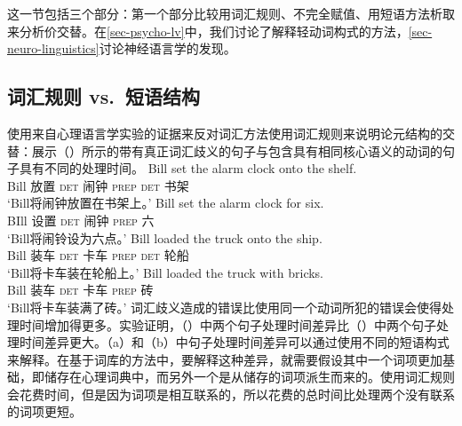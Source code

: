 \begin{exe}
\begin{xlist}[iv.]
\begin{exe}
\begin{xlist}[iv.]
这一节包括三个部分：第一个部分比较用词汇规则、不完全赋值、用短语方法析取来分析价交替。在\ref{sec-psycho-lv}中，我们讨论了解释轻动词构式的方法，\ref{sec-neuro-linguistics}讨论神经语言学的发现。

\subsection{词汇规则 vs.\ 短语结构}
\label{sec-lr-phrasal-psycho}
\mbox{}\citet[\S~1.4.5]{Goldberg95a}使用来自心理语言学实验的证据来反对词汇方法使用词汇规则来说明论元结构的交替：\citet{CT88a}展示（）所示的带有真正词汇歧义的句子与包含具有相同核心语义的动词的句子具有不同的处理时间。
\eal
\ex
\gll Bill set the alarm clock onto the shelf.\\
     Bill 放置 \textsc{det} 闹钟 \textsc{prep} \textsc{det} 书架\\
\glt `Bill将闹钟放置在书架上。' 
\ex
\gll Bill set the alarm clock for six.\\
     BIll 设置 \textsc{det} 闹钟 \textsc{prep} 六\\
\glt `Bill将闹铃设为六点。' 
\zl
\eal
\ex
\gll Bill loaded the truck onto the ship.\\
     Bill 装车 \textsc{det} 卡车 \textsc{prep} \textsc{det} 轮船\\
\glt `Bill将卡车装在轮船上。' 
\ex
\gll Bill loaded the truck with bricks.\\
     Bill 装车 \textsc{det} 卡车 \textsc{prep} 砖\\
\glt `Bill将卡车装满了砖。' 
\zl
词汇歧义造成的错误比使用同一个动词所犯的错误会使得处理时间增加得更多。实验证明，（）中两个句子处理时间差异比（）中两个句子处理时间差异更大。（a）和（b）中句子处理时间差异可以通过使用不同的短语构式来解释。在基于词库的方法中，要解释这种差异，就需要假设其中一个词项更加基础，即储存在心理词典中，而另外一个是从储存的词项派生而来的。使用词汇规则会花费时间，但是因为词项是相互联系的，所以花费的总时间比处理两个没有联系的词项更短\citep[]{Mueller2002b}。

\end{xlist}
\end{exe}
\end{xlist}
\end{exe}
